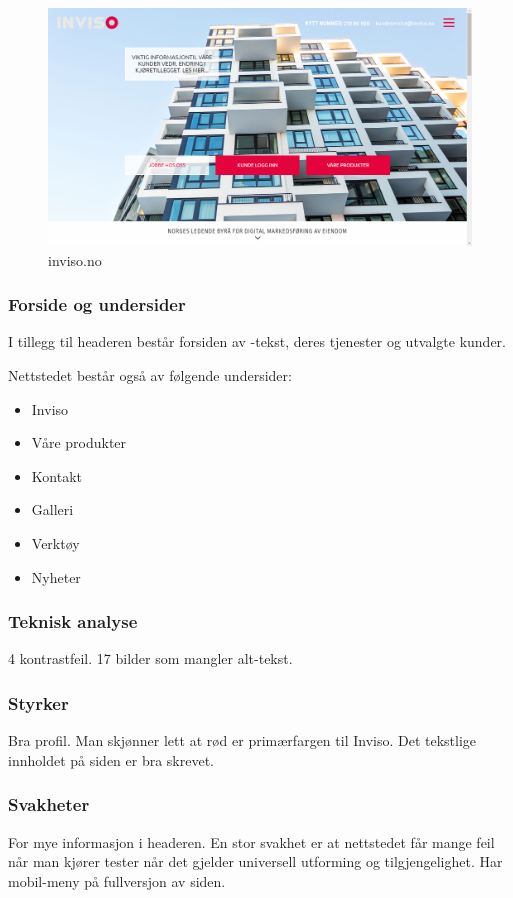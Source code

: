 \begin{figure}[H]
    \centering
    \includegraphics[width=\textwidth]{line/inviso_no_(1366x768).png}
    \caption{inviso.no}
    \label{fig:competitors-inviso.no}
\end{figure}

\subsubsection{Forside og undersider}
I tillegg til headeren består forsiden av -tekst, deres tjenester og utvalgte kunder. 

Nettstedet består også av følgende undersider:
\begin{itemize}
\item Inviso
\item Våre produkter
\item Kontakt
\item Galleri
\item Verktøy
\item Nyheter
\end{itemize}


\subsubsection{Teknisk analyse}
4 kontrastfeil. 17 bilder som mangler alt-tekst. 

\subsubsection{Styrker}
Bra profil. Man skjønner lett at rød er primærfargen til Inviso.
Det tekstlige innholdet på siden er bra skrevet.

\subsubsection{Svakheter}
For mye informasjon i headeren. En stor svakhet er at nettstedet får mange feil når man kjører tester når det gjelder universell utforming og tilgjengelighet. Har mobil-meny på fullversjon av siden.

